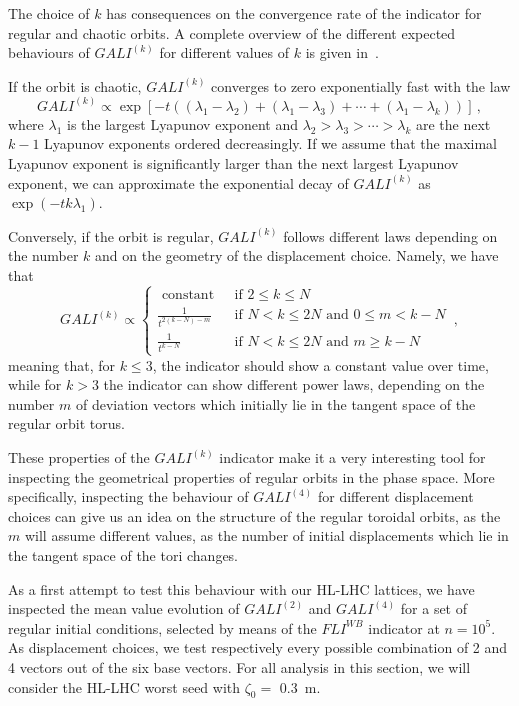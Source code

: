 The choice of $k$ has consequences on the convergence rate of the indicator for regular and chaotic orbits. A complete overview of the different expected behaviours of $GALI^{(k)}$ for different values of $k$ is given in~\cite{SKOKOS200730}.

If the orbit is chaotic, $GALI^{(k)}$ converges to zero exponentially fast with the law
\begin{equation}
    GALI^{(k)} \propto \exp\left[-t\left((\lambda_1 - \lambda_2)+(\lambda_1 - \lambda_3)+\cdots+(\lambda_1 - \lambda_k)\right)\right] \,,
\end{equation}
where $\lambda_1$ is the largest Lyapunov exponent and $\lambda_2> \lambda_3>\cdots>\lambda_k$ are the next $k-1$ Lyapunov exponents ordered decreasingly. If we assume that the maximal Lyapunov exponent is significantly larger than the next largest Lyapunov exponent, we can approximate the exponential decay of $GALI^{(k)}$ as $\exp(-tk\lambda_1)$.

Conversely, if the orbit is regular, $GALI^{(k)}$ follows different laws depending on the number $k$ and on the geometry of the displacement choice. Namely, we have that
\begin{equation}
    GALI^{(k)} \propto \begin{cases}\text { constant } & \text { if } 2 \leq k \leq N \\ \frac{1}{t^{2(k-N)-m}} & \text { if } N<k \leq 2 N \text { and } 0 \leq m<k-N \\ \frac{1}{t^{k-N}} & \text { if } N<k \leq 2 N \text { and } m \geq k-N\end{cases} \,,
\end{equation}
meaning that, for $k\leq3$, the indicator should show a constant value over time, while for $k>3$ the indicator can show different power laws, depending on the number $m$ of deviation vectors which initially lie in the tangent space of the regular orbit torus.

These properties of the $GALI^{(k)}$ indicator make it a very interesting tool for inspecting the geometrical properties of regular orbits in the phase space. More specifically, inspecting the behaviour of $GALI^{(4)}$ for different displacement choices can give us an idea on the structure of the regular toroidal orbits, as the $m$ will assume different values, as the number of initial displacements which lie in the tangent space of the tori changes.

As a first attempt to test this behaviour with our HL-LHC lattices, we have inspected the mean value evolution of $GALI^{(2)}$ and $GALI^{(4)}$ for a set of regular initial conditions, selected by means of the $FLI^{WB}$ indicator at $n=10^5$. As displacement choices, we test respectively every possible combination of 2 and 4 vectors out of the six base vectors. For all analysis in this section, we will consider the HL-LHC worst seed with $\zeta_0=$ \SI{0.3}{\metre}.

